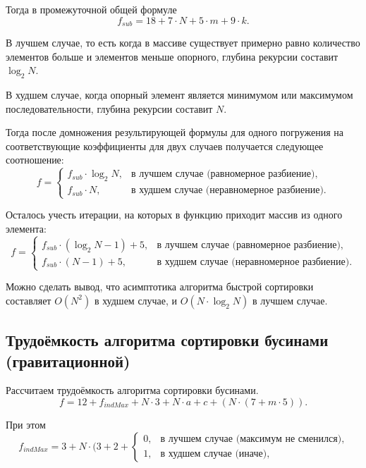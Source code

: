 Тогда в промежуточной общей формуле
\begin{equation}
	f_{sub} = 18 + 7 \cdot N + 5 \cdot m + 9 \cdot k.
\end{equation}

В лучшем случае, то есть когда в массиве существует примерно равно количество элементов больше и элементов меньше опорного, глубина рекурсии составит $\log_2N$.

В худшем случае, когда опорный элемент является минимумом или максимумом последовательности, глубина рекурсии составит $N$.

Тогда после домножения результирующей формулы для одного погружения на соответствующие коэффициенты для двух случаев получается следующее соотношение:
\begin{equation}
	f = \begin{cases}
	f_{sub} \cdot \log_2N,& \text{в лучшем случае (равномерное разбиение)}, \\
	f_{sub} \cdot N,& \text{в худшем случае (неравномерное разбиение)}.
\end{cases}
\end{equation}

Осталось учесть итерации, на которых в функцию приходит массив из одного элемента:
\begin{equation}
	f = \begin{cases}
	f_{sub} \cdot (\log_2N - 1) + 5,& \text{в лучшем случае (равномерное разбиение)}, \\
	f_{sub} \cdot (N - 1) + 5,& \text{в худшем случае (неравномерное разбиение)}.
\end{cases}
\end{equation}

Можно сделать вывод, что асимптотика алгоритма быстрой сортировки составляет $O(N^2)$ в худшем случае, и $O(N \cdot \log_2N)$ в лучшем случае.

\newpage

\subsection{Трудоёмкость алгоритма сортировки бусинами (гравитационной)}
Рассчитаем трудоёмкость алгоритма сортировки бусинами.
\begin{equation} \label{eqn:bead1}
	f = 12 + f_{indMax} + N \cdot 3 + N \cdot a + c + (N \cdot (7 + m \cdot 5)).
\end{equation}

При этом
\begin{equation}
	f_{indMax} = 3 + N \cdot  (3 + 2 + \begin{cases}
		0,& \text{в лучшем случае (максимум не сменился)}, \\
		1,& \text{в худшем случае (иначе)},
	\end{cases}
\end{equation}

